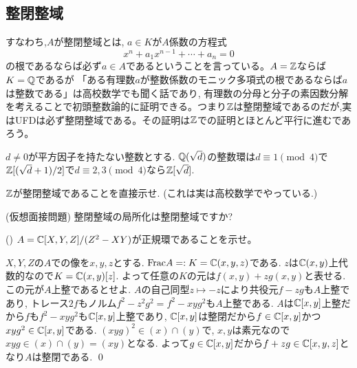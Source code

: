 \subsection{整閉整域}

\begin{prac}

\end{prac}

\begin{rem}
すなわち,$A$が整閉整域とは,  $a\in K$が$A$係数の方程式
\[x^{n} + a_1x^{n-1} + \cdots + a_{n} = 0\]
の根であるならば必ず$a\in A$であるということを言っている。$A=\mathbb{Z}$ならば$K=\mathbb{Q}$であるが 「ある有理数$a$が整数係数のモニック多項式の根であるならば$a$は整数である」は高校数学でも聞く話であり, 有理数の分母と分子の素因数分解を考えることで初頭整数論的に証明できる。つまり$\mathbb{Z}$は整閉整域であるのだが,実はUFDは必ず整閉整域である。その証明は$\mathbb{Z}$での証明とほとんど平行に進むであろう。
\end{rem}

\begin{recall} $d\neq 0$が平方因子を持たない整数とする.
$\mathbb{Q}(\sqrt{d})$の整数環は$d\equiv 1\pmod{4}$で$\mathbb{Z}[(\sqrt{d}+1)/2]$で$d\equiv 2,3\pmod{4}$なら$\mathbb{Z}[\sqrt{d}]$.
\end{recall}


\begin{prac}
$\mathbb{Z}$が整閉整域であることを直接示せ. (これは実は高校数学でやっている.)
\end{prac}

\begin{prac} (仮想面接問題)
整閉整域の局所化は整閉整域ですか?
\end{prac}



\begin{egprob} (\cite{aoyukie})
$A=\mathbb{C}[X,Y,Z]/(Z^2 - XY)$が正規環であることを示せ。
\end{egprob}
\begin{egans}
$X,Y,Z$の$A$での像を$x,y,z$とする. $\mathrm{Frac}A =:K  = \mathbb{C}(x,y,z)$である. $z$は$\mathbb{C}(x,y)$上代数的なので$K=\mathbb{C}(x,y)[z]$. よって任意の$K$の元は$f(x,y) + zg(x,y)$と表せる. この元が$A$上整であるとせよ. $A$の自己同型$z\mapsto -z$により共役元$f - zg$も$A$上整であり, トレース$2f$もノルム$f^2-z^2g^2 = f^2-xyg^2$も$A$上整である. $A$は$\mathbb{C}[x,y]$上整だから$f$も$f^2-xyg^2$も$\mathbb{C}[x,y]$上整であり, $\mathbb{C}[x,y]$は整閉だから$f\in\mathbb{C}[x,y]$かつ$xyg^2\in \mathbb{C}[x,y]$である. $(xyg)^2 \in (x)\cap (y)$で, $x,y$は素元なので$xyg\in (x)\cap (y)=(xy)$となる. よって$g\in \mathbb{C}[x,y]$だから$f+zg \in \mathbb{C}[x,y,z]$となり$A$は整閉である. \qed
\end{egans}


